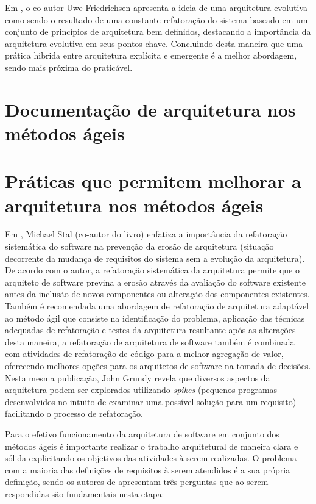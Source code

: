 Em \cite{babar2013agile}, o co-autor Uwe Friedrichsen apresenta a ideia de uma arquitetura evolutiva como sendo o resultado de uma constante refatoração do sistema baseado em um conjunto de princípios de arquitetura bem definidos, destacando a importância da arquitetura evolutiva em seus pontos chave. Concluindo desta maneira que uma prática hibrida entre arquitetura explícita e emergente é a melhor abordagem, sendo mais próxima do praticável.



\section{Documentação de arquitetura nos métodos ágeis}

\section{Práticas que permitem melhorar a arquitetura nos métodos ágeis}

Em \cite{babar2013agile}, Michael Stal (co-autor do livro) enfatiza a importância da refatoração sistemática do software na prevenção da erosão de arquitetura (situação decorrente da mudança de requisitos do sistema sem a evolução da arquitetura). De acordo com o autor, a refatoração sistemática da arquitetura  permite que o arquiteto de software previna a erosão através da avaliação do software existente antes da inclusão de novos componentes ou alteração dos componentes existentes. Também é recomendada uma abordagem de refatoração de arquitetura adaptável ao método ágil que consiste na identificação do problema, aplicação das técnicas adequadas de refatoração e testes da arquitetura resultante após as alterações desta maneira, a refatoração de arquitetura de software também é combinada com atividades de refatoração de código para a melhor agregação de valor, oferecendo melhores opções para os arquitetos de software na tomada de decisões. Nesta mesma publicação, John Grundy revela que diversos aspectos da arquitetura podem ser explorados utilizando \textit{spikes} (pequenos programas desenvolvidos no intuito de examinar uma possível solução para um requisito) facilitando o processo de refatoração.

Para o efetivo funcionamento da arquitetura de software em conjunto dos métodos ágeis é importante realizar o trabalho arquitetural de maneira clara e sólida explicitando os objetivos das atividades à serem realizadas. O problema com a maioria das definições de requisitos à serem atendidos é a sua própria definição, sendo os autores de \cite{babar2013agile} apresentam três perguntas que ao serem respondidas são fundamentais nesta etapa:


